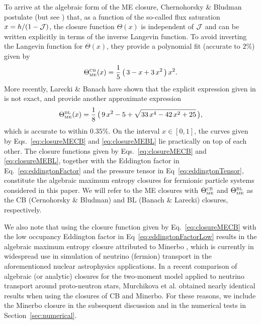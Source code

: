 To arrive at the algebraic form of the ME closure, Chernohorsky \& Bludman \cite{cernohorskyBludman_1994} postulate (but see \cite{lareckiBanach_2011}) that, as a function of the so-called flux saturation $x=h/(1-\mathcal{J})$, the closure function $\Theta(x)$ is independent of $\mathcal{J}$ and can be written explicitly in terms of the inverse Langevin function.  
To avoid inverting the Langevin function for $\Theta(x)$, they provide a polynomial fit (accurate to $2\%$) given by
\begin{equation}
  \Theta_{\mbox{\tiny ME}}^{\mbox{\tiny CB}}(x)
  =\frac{1}{5}\,\big(\,3-x+3\,x^{2}\,\big)\,x^{2}.
  \label{eq:closureMECB}
\end{equation}
More recently, Larecki \& Banach \cite{lareckiBanach_2011} have shown that the explicit expression given in \cite{cernohorskyBludman_1994} is not exact, and provide another approximate expression
\begin{equation}
  \Theta_{\mbox{\tiny ME}}^{\mbox{\tiny BL}}(x)
  =\frac{1}{8}\,\big(\,9\,x^{2}-5+\sqrt{33\,x^{4}-42\,x^{2}+25}\,\big),
  \label{eq:closureMEBL}
\end{equation}
which is accurate to within $0.35\%$.  
On the interval $x\in[0,1]$, the curves given by Eqs.~\eqref{eq:closureMECB} and \eqref{eq:closureMEBL} lie practically on top of each other.  
The closure functions given by Eqs.~\eqref{eq:closureMECB} and \eqref{eq:closureMEBL}, together with the Eddington factor in Eq.~\eqref{eq:eddingtonFactor} and the pressure tensor in Eq~\eqref{eq:eddingtonTensor}, constitute the algebraic maximum entropy closures for fermionic particle systems considered in this paper.  
We will refer to the ME closures with $\Theta_{\mbox{\tiny ME}}^{\mbox{\tiny CB}}$ and $\Theta_{\mbox{\tiny ME}}^{\mbox{\tiny BL}}$ as the CB (Cernohorsky \& Bludman) and BL (Banach \& Larecki) closures, respectively.  

We also note that using the closure function given by Eq.~\eqref{eq:closureMECB} with the low occupancy Eddington factor in Eq~\eqref{eq:eddingtonFactorLow} results in the algebraic maximum entropy closure attributed to Minerbo \cite{minerbo_1978}, which is currently in widespread use in simulation of neutrino (fermion) transport in the aforementioned nuclear astrophysics applications.  
In a recent comparison of algebraic (or analytic) closures for the two-moment model applied to neutrino transport around proto-neutron stars, Murchikova et al. \cite{murchikova_etal_2017} obtained nearly identical results when using the closures of CB and Minerbo.  
For these reasons, we include the Minerbo closure in the subsequent discussion and in the numerical tests in Section~\ref{sec:numerical}.  

